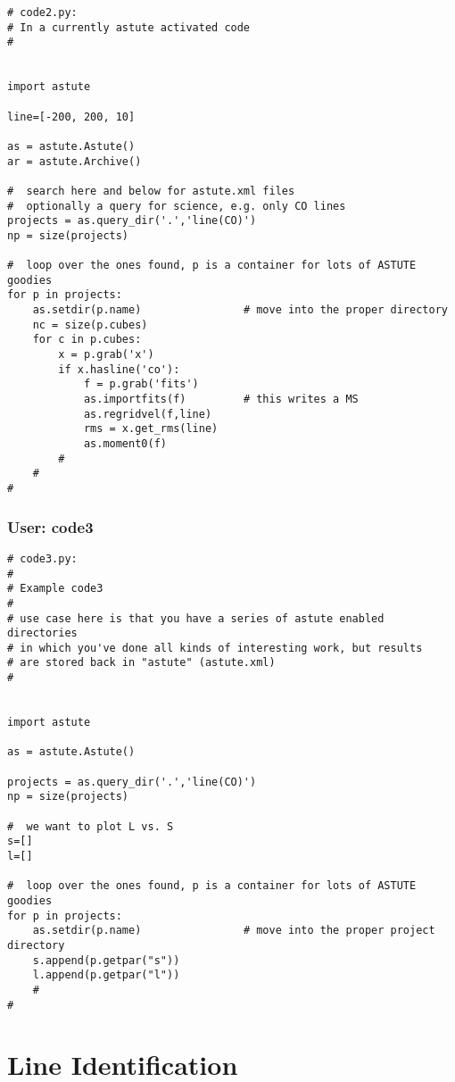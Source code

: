 \documentclass[preprint]{aastex} %
\begin{document}
\footnotesize
\begin{verbatim}
# code2.py:
# In a currently astute activated code
#


import astute

line=[-200, 200, 10]

as = astute.Astute()
ar = astute.Archive()

#  search here and below for astute.xml files
#  optionally a query for science, e.g. only CO lines
projects = as.query_dir('.','line(CO)')
np = size(projects)

#  loop over the ones found, p is a container for lots of ASTUTE goodies
for p in projects:
    as.setdir(p.name)                # move into the proper directory
    nc = size(p.cubes)
    for c in p.cubes:
        x = p.grab('x')
        if x.hasline('co'):
            f = p.grab('fits')
            as.importfits(f)         # this writes a MS
            as.regridvel(f,line)
            rms = x.get_rms(line)
            as.moment0(f)
        #
    #
#

\end{verbatim}
\normalsize


\subsubsection{User: code3}

\footnotesize
\begin{verbatim}
# code3.py:
#
# Example code3
#
# use case here is that you have a series of astute enabled directories
# in which you've done all kinds of interesting work, but results
# are stored back in "astute" (astute.xml)
#


import astute

as = astute.Astute()

projects = as.query_dir('.','line(CO)')
np = size(projects)

#  we want to plot L vs. S
s=[]
l=[]

#  loop over the ones found, p is a container for lots of ASTUTE goodies
for p in projects:
    as.setdir(p.name)                # move into the proper project directory
    s.append(p.getpar("s"))
    l.append(p.getpar("l"))
    #
#

\end{verbatim}
\normalsize





\section{Line Identification}
\end{document}
